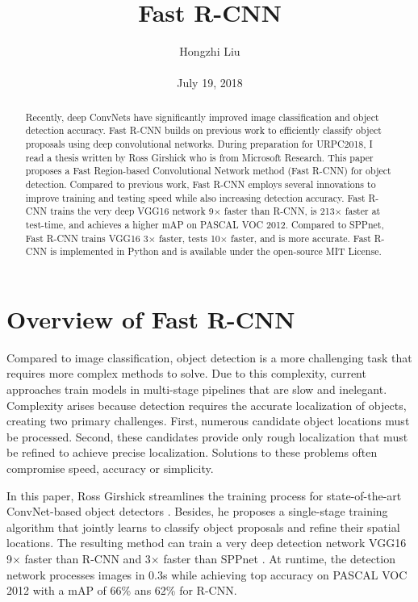 \documentclass[10pt,twocolumn,letterpaper]{article}
\title{Fast R-CNN}
\author{Hongzhi Liu\\\\
July 19, 2018}
\begin{document}
\maketitle
\begin{abstract}
	Recently, deep ConvNets have significantly improved image classification and object detection accuracy. Fast R-CNN builds on previous work to efficiently classify object proposals using deep convolutional networks. During preparation for URPC2018, I read a thesis written by Ross Girshick who is from Microsoft Research. This paper proposes a Fast Region-based Convolutional Network method (Fast R-CNN) for object detection. Compared to previous work, Fast R-CNN employs several innovations to improve training and testing speed while also increasing detection accuracy. Fast R-CNN trains the very deep VGG16 network 9$\times$ faster than R-CNN, is 213$\times$ faster at test-time, and achieves a higher mAP on PASCAL VOC 2012. Compared to SPPnet, Fast R-CNN trains VGG16 3$\times$ faster, tests 10$\times$ faster, and is more accurate. Fast R-CNN is implemented in Python and is available under the open-source MIT License.
\end{abstract}

\section{Overview of Fast R-CNN}

Compared to image classification, object detection is a more challenging task that requires more complex methods to solve. Due to this complexity, current approaches \cite{rich2104,He2014Spatial} train models in multi-stage pipelines that are slow and inelegant. Complexity arises because detection requires the accurate localization of objects, creating two primary challenges. First, numerous candidate object locations must be processed. Second, these candidates provide only rough localization that must be refined to achieve precise localization. Solutions to these problems often compromise speed, accuracy or simplicity.

In this paper, Ross Girshick streamlines the training process for state-of-the-art ConvNet-based object detectors \cite{Girshick2015Fast}. Besides, he proposes a single-stage training algorithm that jointly learns to classify object proposals and refine their spatial locations. The resulting method can train a very deep detection network VGG16 \cite{Simonyan2014Very} 9$\times$ faster than R-CNN \cite{rich2104} and 3$\times$ faster than SPPnet \cite{He2014Spatial}. At runtime, the detection network processes images in 0.3s while achieving top accuracy on PASCAL VOC 2012 \cite{Everingham2010The} with a mAP of 66\% ans 62\% for R-CNN.
\end{document}

